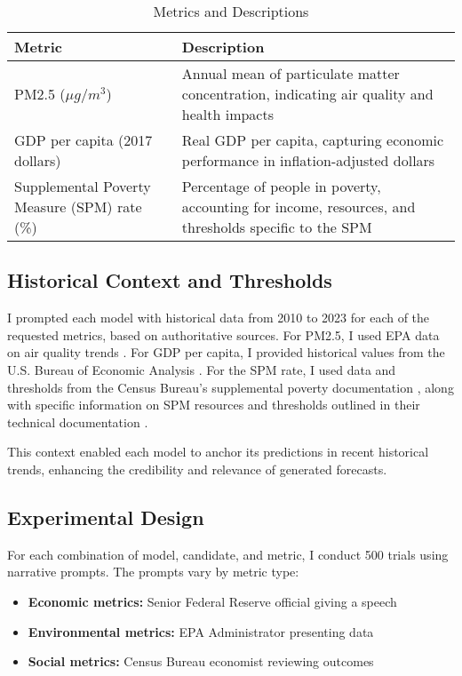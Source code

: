 \begin{table}[htbp]
    \centering
    \small
    \caption{Metrics and Descriptions}
    \begin{tabular}{p{5cm} p{9cm}}
    \hline
    Metric & Description \\
    \hline
    PM2.5 ($\mu g/m^3$) & Annual mean of particulate matter concentration, indicating air quality and health impacts \\
    GDP per capita (2017 dollars) & Real GDP per capita, capturing economic performance in inflation-adjusted dollars \\
    Supplemental Poverty Measure (SPM) rate (\%) & Percentage of people in poverty, accounting for income, resources, and thresholds specific to the SPM \\
    \hline
    \end{tabular}
    \label{tab:metrics}
\end{table}

\subsection{Historical Context and Thresholds}

I prompted each model with historical data from 2010 to 2023 for each of the requested metrics, based on authoritative sources. For PM2.5, I used EPA data on air quality trends \cite{epa_pm25_trends}. For GDP per capita, I provided historical values from the U.S. Bureau of Economic Analysis \cite{fred_gdp_per_capita}. For the SPM rate, I used data and thresholds from the Census Bureau’s supplemental poverty documentation \cite{census_spm_2023}, along with specific information on SPM resources and thresholds outlined in their technical documentation \cite{spm_techdoc}.

This context enabled each model to anchor its predictions in recent historical trends, enhancing the credibility and relevance of generated forecasts.

\subsection{Experimental Design}

For each combination of model, candidate, and metric, I conduct 500 trials using narrative prompts. The prompts vary by metric type:

\begin{itemize}
    \item \textbf{Economic metrics:} Senior Federal Reserve official giving a speech
    \item \textbf{Environmental metrics:} EPA Administrator presenting data
    \item \textbf{Social metrics:} Census Bureau economist reviewing outcomes
\end{itemize}

